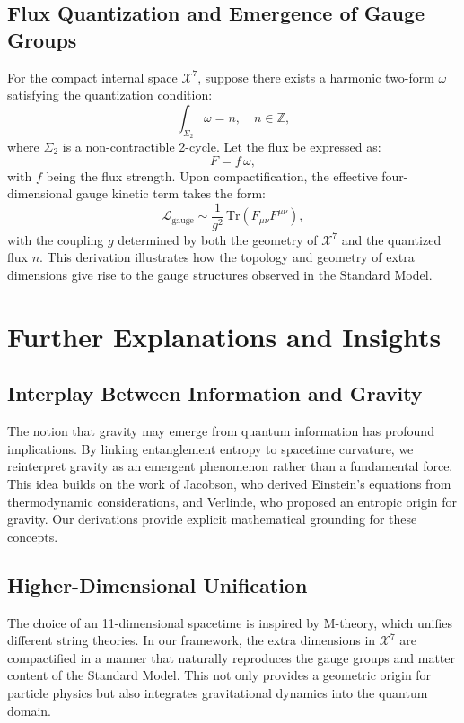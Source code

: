 \documentclass[12pt, a4paper]{article}
\begin{document}
\subsection{Flux Quantization and Emergence of Gauge Groups}
For the compact internal space \(\mathcal{X}^7\), suppose there exists a harmonic two-form \(\omega\) satisfying the quantization condition:
\begin{equation}
    \int_{\Sigma_2} \omega = n, \quad n \in \mathbb{Z},
\end{equation}
where \(\Sigma_2\) is a non-contractible 2-cycle. Let the flux be expressed as:
\begin{equation}
    F = f\, \omega,
\end{equation}
with \(f\) being the flux strength. Upon compactification, the effective four-dimensional gauge kinetic term takes the form:
\begin{equation}
    \mathcal{L}_{\text{gauge}} \sim \frac{1}{g^2} \, \text{Tr}(F_{\mu\nu} F^{\mu\nu}),
\end{equation}
with the coupling \(g\) determined by both the geometry of \(\mathcal{X}^7\) and the quantized flux \(n\). This derivation illustrates how the topology and geometry of extra dimensions give rise to the gauge structures observed in the Standard Model.

\section{Further Explanations and Insights}
\subsection{Interplay Between Information and Gravity}
The notion that gravity may emerge from quantum information has profound implications. By linking entanglement entropy to spacetime curvature, we reinterpret gravity as an emergent phenomenon rather than a fundamental force. This idea builds on the work of Jacobson, who derived Einstein’s equations from thermodynamic considerations, and Verlinde, who proposed an entropic origin for gravity. Our derivations provide explicit mathematical grounding for these concepts.

\subsection{Higher-Dimensional Unification}
The choice of an 11-dimensional spacetime is inspired by M-theory, which unifies different string theories. In our framework, the extra dimensions in \(\mathcal{X}^7\) are compactified in a manner that naturally reproduces the gauge groups and matter content of the Standard Model. This not only provides a geometric origin for particle physics but also integrates gravitational dynamics into the quantum domain.
\end{document}
